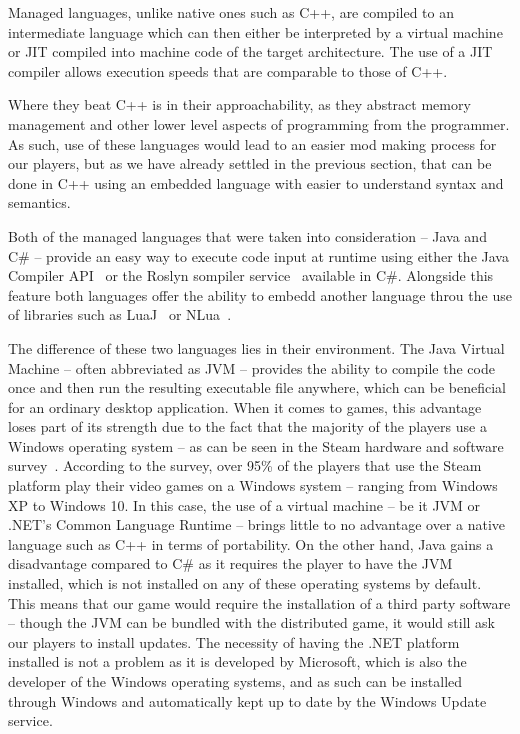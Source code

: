Managed languages, unlike native ones such as C++, are compiled to an intermediate language which can then either
be interpreted by a virtual machine or JIT compiled into machine code of the target architecture. The use
of a JIT compiler allows execution speeds that are comparable to those of C++.

Where they beat C++ is in their approachability, as they abstract memory management and other lower level aspects of programming
from the programmer. As such, use of these languages would lead to an easier mod making process for our players, but as
we have already settled in the previous section, that can be done in C++ using an embedded language with easier to
understand syntax and semantics.

Both of the managed languages that were taken into consideration -- Java and C\# -- provide an easy way to execute code input
at runtime using either the Java Compiler API~\cite{JavaCompAPI} or the Roslyn sompiler service~\cite{Roslyn} available in C\#.
Alongside this feature both languages offer the ability to embedd another language throu the use of libraries such as
LuaJ~\cite{LuaJ} or NLua~\cite{NLua}.

The difference of these two languages lies in their environment. The Java Virtual Machine -- often abbreviated as JVM -- provides
the ability to compile the code once and then run the resulting executable file anywhere, which can be beneficial for an ordinary
desktop application. When it comes to games, this advantage loses part of its strength due to the fact that the majority of the
players use a Windows operating system -- as can be seen in the Steam hardware and software survey~\cite{SteamHW}. According
to the survey, over 95\% of the players that use the Steam platform  play their video games on a Windows system -- ranging
from Windows XP to Windows 10. In this case, the use of a virtual machine -- be it JVM or .NET's Common Language Runtime -- brings
little to no advantage over a native language such as C++ in terms of portability. On the other hand, Java gains a disadvantage
compared to C\# as it requires the player to have the JVM installed, which is not installed on any of these operating systems
by default. This means that our game would require the installation of a third party software -- though the JVM can be bundled
with the distributed game, it would still ask our players to install updates. The necessity of having the .NET platform
installed is not a problem as it is developed by Microsoft,
which is also the developer of the Windows operating systems, and as such can be installed through Windows and automatically kept
up to date by the Windows Update service.

